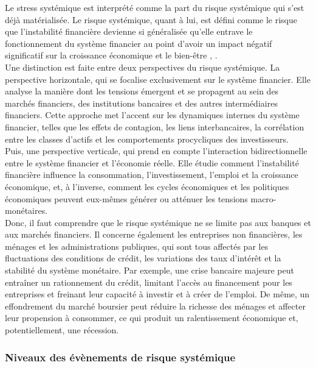 Le stress systémique est interprété comme la part du risque systémique qui s’est déjà matérialisée. Le risque systémique, quant à lui, est défini comme le risque que l’instabilité financière devienne si généralisée qu’elle entrave le fonctionnement du système financier au point d’avoir un impact négatif significatif sur la croissance économique et le bien-être \citep{debandt2000systemic}, \citep{debandt2009systemic}.\\

Une distinction est faite entre deux perspectives du risque systémique.
La perspective horizontale, qui se focalise exclusivement sur le système financier. Elle analyse la manière dont les tensions émergent et se propagent au sein des marchés financiers, des institutions bancaires et des autres intermédiaires financiers. Cette approche met l’accent sur les dynamiques internes du système financier, telles que les effets de contagion, les liens interbancaires, la corrélation entre les classes d’actifs et les comportements procycliques des investisseurs.\\
Puis, une perspective verticale, qui prend en compte l’interaction bidirectionnelle entre le système financier et l’économie réelle. Elle étudie comment l’instabilité financière influence la consommation, l’investissement, l’emploi et la croissance économique, et, à l’inverse, comment les cycles économiques et les politiques économiques peuvent eux-mêmes générer ou atténuer les tensions macro-monétaires.\\

Donc, il faut comprendre que le risque systémique ne se limite pas aux banques et aux marchés financiers. Il concerne également les entreprises non financières, les ménages et les administrations publiques, qui sont tous affectés par les fluctuations des conditions de crédit, les variations des taux d’intérêt et la stabilité du système monétaire. Par exemple, une crise bancaire majeure peut entraîner un rationnement du crédit, limitant l’accès au financement pour les entreprises et freinant leur capacité à investir et à créer de l’emploi. De même, un effondrement du marché boursier peut réduire la richesse des ménages et affecter leur propension à consommer, ce qui produit un ralentissement économique et, potentiellement, une récession.

\subsubsection{Niveaux des évènements de risque systémique}

